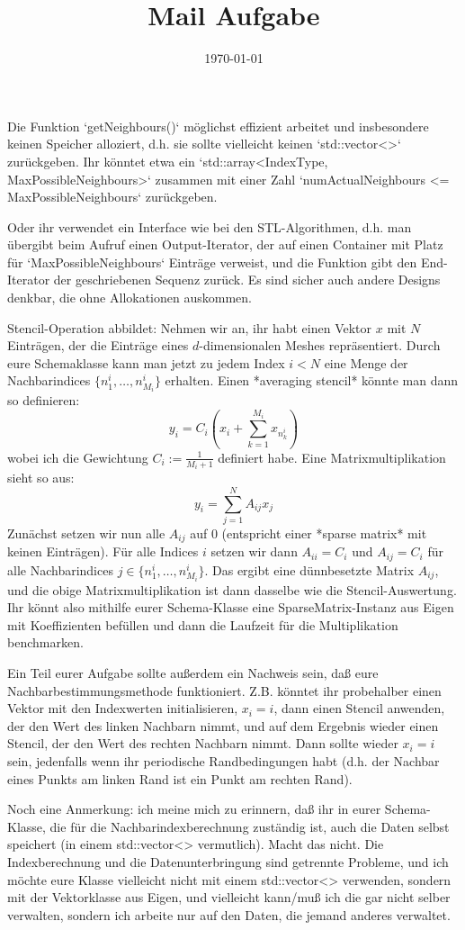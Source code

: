 \documentclass[12pt]{article}
\title{Mail Aufgabe}
\author{}
\date{\today}
\begin{document}
\maketitle

Die Funktion `getNeighbours()` möglichst effizient arbeitet und insbesondere keinen Speicher alloziert, d.h. sie sollte vielleicht keinen `std::vector<>` zurückgeben. Ihr könntet etwa ein `std::array<IndexType, MaxPossibleNeighbours>` zusammen mit einer Zahl `numActualNeighbours <= MaxPossibleNeighbours` zurückgeben.

Oder ihr verwendet ein Interface wie bei den STL-Algorithmen, d.h. man übergibt beim Aufruf einen Output-Iterator, der auf einen Container mit Platz für `MaxPossibleNeighbours` Einträge verweist, und die Funktion gibt den End-Iterator der geschriebenen Sequenz zurück. Es sind sicher auch andere Designs denkbar, die ohne Allokationen auskommen.

Stencil-Operation abbildet: Nehmen wir an, ihr habt einen Vektor $x$ mit $N$ Einträgen, der die Einträge eines $d$-dimensionalen Meshes repräsentiert. Durch eure Schemaklasse kann man jetzt zu jedem Index $i \lt N$ eine Menge der Nachbarindices $\{ n^i_1, \ldots, n^i_{M_i} \}$ erhalten. Einen *averaging stencil* könnte man dann so definieren:
$$y_i = C_i \left(x_i + \sum_{k = 1}^{M_i} x_{n^i_k} \right)$$
wobei ich die Gewichtung $C_i := \frac{1}{M_i + 1}$ definiert habe.
Eine Matrixmultiplikation sieht so aus:
$$y_i = \sum_{j = 1}^N A_{ij} x_j$$
Zunächst setzen wir nun alle $A_{ij}$ auf 0 (entspricht einer *sparse matrix* mit keinen Einträgen). Für alle Indices $i$ setzen wir dann $A_{ii} = C_i$ und $A_{ij} = C_i$ für alle Nachbarindices $j \in \{ n^i_1, \ldots, n^i_{M_i} \}$. Das ergibt eine dünnbesetzte Matrix $A_{ij}$, und die obige Matrixmultiplikation ist dann dasselbe wie die Stencil-Auswertung. Ihr könnt also mithilfe eurer Schema-Klasse eine SparseMatrix-Instanz aus Eigen mit Koeffizienten befüllen und dann die Laufzeit für die Multiplikation benchmarken.

Ein Teil eurer Aufgabe sollte außerdem ein Nachweis sein, daß eure Nachbarbestimmungsmethode funktioniert. Z.B. könntet ihr probehalber einen Vektor mit den Indexwerten initialisieren, $x_i = i$, dann einen Stencil anwenden, der den Wert des linken Nachbarn nimmt, und auf dem Ergebnis wieder einen Stencil, der den Wert des rechten Nachbarn nimmt. Dann sollte wieder $x_i = i$ sein, jedenfalls wenn ihr periodische Randbedingungen habt (d.h. der Nachbar eines Punkts am linken Rand ist ein Punkt am rechten Rand).

Noch eine Anmerkung: ich meine mich zu erinnern, daß ihr in eurer Schema-Klasse, die für die Nachbarindexberechnung zuständig ist, auch die Daten selbst speichert (in einem std::vector<> vermutlich). Macht das nicht. Die Indexberechnung und die Datenunterbringung sind getrennte Probleme, und ich möchte eure Klasse vielleicht nicht mit einem std::vector<> verwenden, sondern mit der Vektorklasse aus Eigen, und vielleicht kann/muß ich die gar nicht selber verwalten, sondern ich arbeite nur auf den Daten, die jemand anderes verwaltet.
\end{document}
